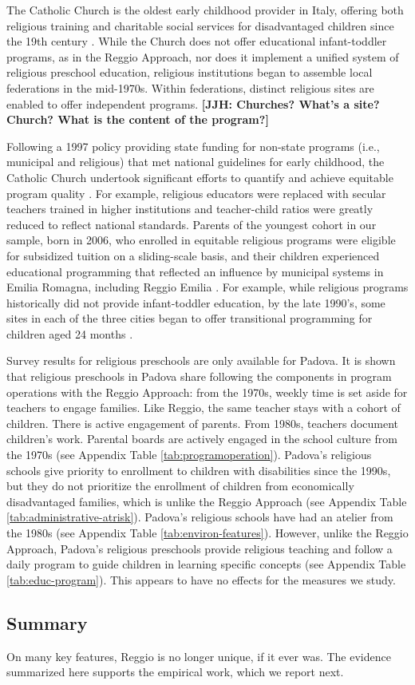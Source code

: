 The Catholic Church is the oldest early childhood provider in Italy, offering both religious training and charitable social services for disadvantaged children since the 19th century \citep{OECD_2001_Italy-Country-Note}. While the Church does not offer educational infant-toddler programs, as in the Reggio Approach, nor does it implement a unified system of religious preschool education, religious institutions began to assemble local federations in the mid-1970s. Within federations, distinct religious sites are enabled to offer independent programs. \textbf{[JJH: Churches? What's a site? Church? What is the content of the program?]}

Following a 1997 policy providing state funding for non-state programs (i.e., municipal and religious) that met national guidelines for early childhood, the Catholic Church undertook significant efforts to quantify and achieve equitable program quality \citep{Malizia-Cicatelli_2011_BOOK_Catholic-School}. For example, religious educators were replaced with secular teachers trained in higher institutions and teacher-child ratios were greatly reduced to reflect national standards. Parents of the youngest cohort in our sample, born in 2006, who enrolled in equitable religious programs were eligible for subsidized tuition on a sliding-scale basis, and their children experienced educational programming that reflected an influence by municipal systems in Emilia Romagna, including Reggio Emilia \citep{Hohnerlein_2009_Paradox-Public-Preschools,OECD_2001_Italy-Country-Note}. For example, while religious programs historically did not provide infant-toddler education, by the late 1990's, some sites in each of the three cities began to offer transitional programming for children aged 24 months \citep{Malizia-Cicatelli_2011_BOOK_Catholic-School,CEHD_2016_Historical-Analysis}.

Survey results for religious preschools are only available for Padova. It is shown that religious preschools in Padova share following the components in program operations with the Reggio Approach: from the 1970s, weekly time is set aside for teachers to engage families. Like Reggio, the same teacher stays with a cohort of children. There is active engagement of parents. From 1980s, teachers document children's work. Parental boards are actively engaged in the school culture from the 1970s (see Appendix Table \ref{tab:programoperation}). Padova's religious schools give priority to enrollment to children with disabilities since the 1990s, but they do not prioritize the enrollment of children from economically disadvantaged families, which is unlike the Reggio Approach (see Appendix Table \ref{tab:administrative-atrisk}). Padova's religious schools have had an atelier from the 1980s (see Appendix Table \ref{tab:environ-features}). However, unlike the Reggio Approach, Padova's religious preschools provide religious teaching and follow a daily program to guide children in learning specific concepts (see Appendix Table \ref{tab:educ-program}). This appears to have no effects for the measures we study.

\subsection{Summary}

On many key features, Reggio is no longer unique, if it ever was. The evidence summarized here supports the empirical work, which we report next.

